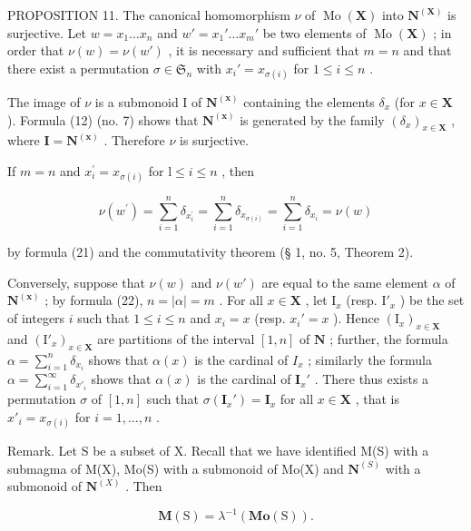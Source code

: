 PROPOSITION 11. The canonical homomorphism \(\nu\) of \(\operatorname{Mo}(\mathbf{X})\) into \(\mathbf{N}^{(\mathbf{X})}\) is surjective. Let \(w = x_1 \ldots x_n\) and \(w' = x_1' \ldots x_m'\) be two elements of \(\operatorname{Mo}(\mathbf{X})\) ; in order that \(\nu(w) = \nu(w')\) , it is necessary and sufficient that \(m = n\) and that there exist a permutation \(\sigma \in \mathfrak{S}_n\) with \(x_i' = x_{\sigma(i)}\) for \(1 \leqslant i \leqslant n\) .

The image of \(\nu\) is a submonoid I of \(\mathbf{N}^{(\mathbf{x})}\) containing the elements \(\delta_x\) (for \(x \in \mathbf{X}\) ). Formula (12) (no. 7) shows that \(\mathbf{N}^{(\mathbf{x})}\) is generated by the family \((\delta_x)_{x \in \mathbf{X}}\) , where \(\mathbf{I} = \mathbf{N}^{(\mathbf{x})}\) . Therefore \(\nu\) is surjective.

If \(m = n\) and \(x_{i}^{\prime} = x_{\sigma (i)}\) for \(\mathrm{l}\leqslant i\leqslant n\) , then

\[
\nu (w ^ {\prime}) = \sum_ {i = 1} ^ {n} \delta_ {x _ {i} ^ {\prime}} = \sum_ {i = 1} ^ {n} \delta_ {x _ {\sigma (i)}} = \sum_ {i = 1} ^ {n} \delta_ {x _ {i}} = \nu (w)
\]

by formula (21) and the commutativity theorem (§ 1, no. 5, Theorem 2).

Conversely, suppose that \(\nu(w)\) and \(\nu(w')\) are equal to the same element \(\alpha\) of \(\mathbf{N}^{(\mathbf{x})}\) ; by formula (22), \(n = |\alpha| = m\) . For all \(x \in \mathbf{X}\) , let \(\mathrm{I}_x\) (resp. \(\mathrm{I}'_x\) ) be the set of integers \(i\) such that \(1 \leqslant i \leqslant n\) and \(x_i = x\) (resp. \(x_i' = x\) ). Hence \((\mathrm{I}_x)_{x \in \mathbf{X}}\) and \((\mathrm{I}'_x)_{x \in \mathbf{X}}\) are partitions of the interval \([1, n]\) of \(\mathbf{N}\) ; further, the formula \(\alpha = \sum_{i=1}^{n} \delta_{x_i}\) shows that \(\alpha(x)\) is the cardinal of \(I_x\) ; similarly the formula \(\alpha = \sum_{i=1}^{\infty} \delta_{x'_i}\) shows that \(\alpha(x)\) is the cardinal of \(\mathbf{I}_x'\) . There thus exists a permutation \(\sigma\) of \([1, n]\) such that \(\sigma(\mathbf{I}_x') = \mathbf{I}_x\) for all \(x \in \mathbf{X}\) , that is \(x'_i = x_{\sigma(i)}\) for \(i = 1, \ldots, n\) .

Remark. Let S be a subset of X. Recall that we have identified M(S) with a submagma of M(X), Mo(S) with a submonoid of Mo(X) and \(\mathbf{N}^{(S)}\) with a submonoid of \(\mathbf{N}^{(X)}\) . Then

\[
\mathbf {M} (\mathrm{S}) = \lambda^ {- 1} (\mathbf {M o} (\mathrm{S})).\tag{23}
\]

